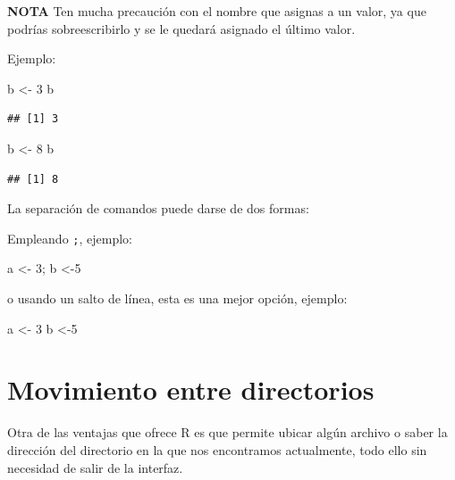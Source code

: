 \documentclass[
]{book}
\newenvironment{Shaded}{\begin{snugshade}}{\end{snugshade}}
\newcommand{\DecValTok}[1]{\textcolor[rgb]{0.00,0.00,0.81}{#1}}
\newcommand{\NormalTok}[1]{#1}
\newcommand{\OtherTok}[1]{\textcolor[rgb]{0.56,0.35,0.01}{#1}}
\begin{document}
\textbf{NOTA} Ten mucha precaución con el nombre que asignas a un valor, ya que podrías sobreescribirlo y se le quedará asignado el último valor.

Ejemplo:

\begin{Shaded}
\begin{Highlighting}[]
\NormalTok{b }\OtherTok{\textless{}{-}} \DecValTok{3}
\NormalTok{b}
\end{Highlighting}
\end{Shaded}

\begin{verbatim}
## [1] 3
\end{verbatim}

\begin{Shaded}
\begin{Highlighting}[]
\NormalTok{b }\OtherTok{\textless{}{-}} \DecValTok{8} 
\NormalTok{b}
\end{Highlighting}
\end{Shaded}

\begin{verbatim}
## [1] 8
\end{verbatim}

La separación de comandos puede darse de dos formas:

Empleando \texttt{;}, ejemplo:

\begin{Shaded}
\begin{Highlighting}[]
\NormalTok{a }\OtherTok{\textless{}{-}} \DecValTok{3}\NormalTok{; b }\OtherTok{\textless{}{-}}\DecValTok{5}
\end{Highlighting}
\end{Shaded}

o usando un salto de línea, esta es una mejor opción, ejemplo:

\begin{Shaded}
\begin{Highlighting}[]
\NormalTok{a }\OtherTok{\textless{}{-}} \DecValTok{3}
\NormalTok{b }\OtherTok{\textless{}{-}}\DecValTok{5}
\end{Highlighting}
\end{Shaded}

\section{Movimiento entre directorios}\label{movimiento-entre-directorios}

Otra de las ventajas que ofrece R es que permite ubicar algún archivo o saber la dirección del directorio en la que nos encontramos actualmente, todo ello sin necesidad de salir de la interfaz.
\end{document}
